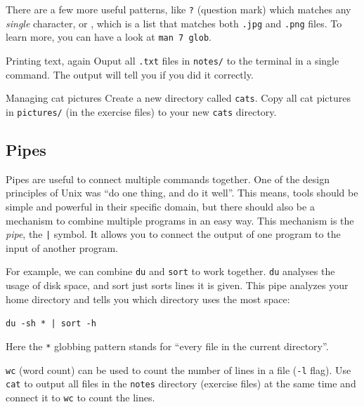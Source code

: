 \documentclass{TheAlternativeCourse}
\begin{document}
There are a few more useful patterns, like \texttt{?} (question mark) which
matches any \emph{single} character, or \texttt{},
which is a list that matches both \texttt{.jpg} and \texttt{.png} files. To
learn more, you can have a look at \texttt{man 7 glob}.

\begin{exercisebox}{Printing text, again}
    Ouput all \texttt{.txt} files in \texttt{notes/} to the terminal in
    a single command. The output will tell you if you did it correctly.
\end{exercisebox}

\begin{exercisebox}{Managing cat pictures}
    Create a new directory called \texttt{cats}. Copy all cat pictures in
    \texttt{pictures/} (in the exercise files) to your new \texttt{cats}
    directory.
\end{exercisebox}

\subsection{Pipes}

Pipes are useful to connect multiple commands together. One of the design
principles of Unix was ``do one thing, and do it well''. This means, tools should
be simple and powerful in their specific domain, but there should also be a
mechanism to combine multiple programs in an easy way. This mechanism is the
\emph{pipe}, the \texttt{|} symbol. It allows you to connect the output of one
program to the input of another program.

For example, we can combine \texttt{du} and \texttt{sort} to work together.
\texttt{du} analyses the usage of disk space, and sort just sorts lines
it is given. This pipe analyzes your home directory and tells you which
directory uses the most space:

\begin{cmdbox}
    \texttt{du -sh * | sort -h}
\end{cmdbox}

Here the \texttt{*} globbing pattern stands for ``every file in the current
directory''.

\begin{exercisebox}
    \texttt{wc} (word count) can be used to count the number of lines in a file
    (\texttt{-l} flag). Use \texttt{cat} to output all files in the
    \texttt{notes} directory (exercise files) at the same time and connect it
    to \texttt{wc} to count the lines.
\end{exercisebox}
\end{document}
